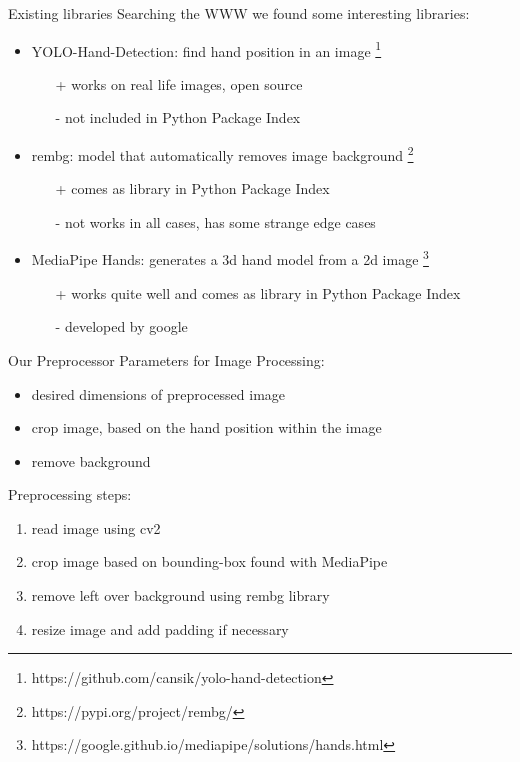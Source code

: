 \documentclass[aspectratio=169]{beamer}
\begin{document}
{	\begin{frame}{Existing libraries}
	Searching the WWW we found some interesting libraries:
	\begin{itemize}
		\item YOLO-Hand-Detection: find hand position in an image \footnote{https://github.com/cansik/yolo-hand-detection}
		\begin{itemize}
			\item[+] works on real life images, open source
			\item[-] not included in Python Package Index
		\end{itemize}
		\pause
		\item rembg: model that automatically removes image background \footnote{https://pypi.org/project/rembg/}
		\begin{itemize}
			\item[+] comes as library in Python Package Index 
			\item[-] not works in all cases, has some strange edge cases
		\end{itemize}
		\pause
		\item MediaPipe Hands: generates a 3d hand model from a 2d image \footnote{https://google.github.io/mediapipe/solutions/hands.html}
		\begin{itemize}
			\item[+] works quite well and comes as library in Python Package Index 
			\item[-] developed by google
		\end{itemize}
	\end{itemize}
	\end{frame}
	
	\begin{frame}{Our Preprocessor}
	Parameters for Image Processing:
	\begin{itemize}
		\item desired dimensions  of preprocessed image
		\item crop image, based on the hand position within the image
		\item remove background
	\end{itemize}
	Preprocessing steps:
	\begin{enumerate}
	\item read image using cv2
	\item crop image based on bounding-box found with MediaPipe
	\item remove left over background using rembg library
	\item resize image and add padding if necessary
	\end{enumerate}
	\end{frame}
	
}
\end{document}
